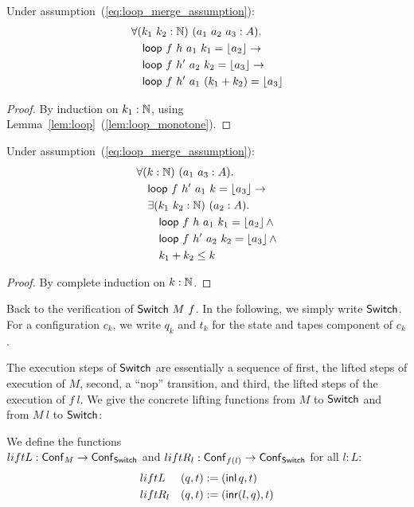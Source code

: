 \begin{lemma}
  \label{lem:loop_merge}
  Under assumption~(\ref{eq:loop_merge_assumption}):
  \begin{align*}
    & \forall (k_1~k_2:\mathbb{N})~(a_1~a_2~a_3 : A).\\
    & \quad \mathsf{loop}~f~h ~a_1~k_1       = \left\lfloor {a_2} \right\rfloor \rightarrow\\
    & \quad \mathsf{loop}~f~h'~a_2~k_2       = \left\lfloor {a_3} \right\rfloor \rightarrow\\
    & \quad \mathsf{loop}~f~h'~a_1~(k_1+k_2) = \left\lfloor {a_3} \right\rfloor
  \end{align*}
\end{lemma}
\begin{proof}
  By induction on $k_1:\mathbb{N}$, using Lemma~\ref{lem:loop}~(\ref{lem:loop_monotone}).
\end{proof}
\begin{lemma}
  \label{lem:loop_split}
  Under assumption~(\ref{eq:loop_merge_assumption}):
  \begin{align*}
    & \forall (k:\mathbb{N})~(a_1~a_3 : A).\\
    & \quad \mathsf{loop}~f~h'~a_1~k = \left\lfloor {a_3} \right\rfloor \rightarrow \\
    & \quad \exists (k_1~k_2:\mathbb{N})~(a_2:A).\\
    & \quad \quad \mathsf{loop}~f~h ~a_1~k_1 = \left\lfloor {a_2} \right\rfloor \land\\
    & \quad \quad \mathsf{loop}~f~h'~a_2~k_2 = \left\lfloor {a_3} \right\rfloor \land\\
    & \quad \quad k_1 + k_2 \leq k
  \end{align*}
\end{lemma}
\begin{proof}
  By complete induction on $k:\mathbb{N}$.
\end{proof}


Back to the verification of $\mathsf{Switch}~M~f$.  In the following, we simply write $\mathsf{Switch}$.  For a configuration $c_k$, we write $q_k$ and $t_k$ for the
state and tapes component of $c_k$.

The execution steps of $\mathsf{Switch}$ are essentially a sequence of first, the lifted steps of execution of $M$, second, a ``nop'' transition, and third,
the lifted steps of the execution of $f~l$.  We give the concrete lifting functions from $M$ to $\mathsf{Switch}$ and from $M~l$ to $\mathsf{Switch}$:
%
\begin{definition}
  We define the functions \\$liftL : \mathsf{Conf}_M \rightarrow \mathsf{Conf}_{\mathsf{Switch}}$ and $liftR_l : \mathsf{Conf}_{f(l)} \rightarrow \mathsf{Conf}_{\mathsf{Switch}}$ for all $l:L$:
  \begin{alignat*}{2}
    & liftL   & (q, t) &:= (\operatorname{\mathsf{inl}} q,      t) \\
    & liftR_l & (q, t) &:= (\operatorname{\mathsf{inr}} (l, q), t)
  \end{alignat*}
\end{definition}

